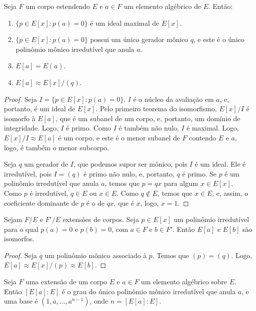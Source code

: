 \begin{prop}
    Seja $F$ um corpo estendendo $E$ e $a\in F$ um elemento algébrico de $E$. Então:
    \begin{enumerate}
        \item $\{p \in E[x]: p(a)=0\}$ é um ideal maximal de $E[x]$.
        \item $\{p \in E[x]: p(a)=0\}$ possui um único gerador mônico $q$, e este é o único polinômio mônico irredutível que anula $a$.
        \item $E[a]=E(a)$.
        \item $E[a]\approx E[x]/(q)$.
    \end{enumerate}
\end{prop}
\begin{proof}
    Seja $I=\{p \in E[x]: p(a)=0\}$. $I$ é o núcleo da avaliação em $a$, e, portanto, é um ideal de $E[x]$.
    Pelo primeiro teorema do isomorfismo, $E[x]/I$ é isomorfo à $E[a]$, que é um subanel de um corpo, e, portanto, um domínio de integridade. Logo, $I$ é primo.
    Como $I$ é também não nulo, $I$ é maximal.
    Logo, $E[x]/I\approx E[a]$ é um corpo, e este é o menor subanel de $F$ contendo $E$ e $a$, logo, é também o menor subcorpo.

    Seja $q$ um gerador de $I$, que podemos supor ser mônico, pois $I$ é um ideal.
    Ele é irredutível, pois $I=(q)$ é primo não nulo, e, portanto, $q$ é primo.
    Se $p$ é um polinômio irredutível que anula $a$, temos que $p=qx$ para algum $x \in E[x]$. Como $p$ é irredutível, $q \in E$ ou $x \in E$. Como $q \notin E$, temos que $x \in E$, e, assim, o coeficiente dominante de $p$ é o de $qx$, que é $x$, logo, $x=1$.
\end{proof}
\begin{corol}
    Sejam $F/E$ e $F'/E$ extensões de corpos. Seja $p\in E[x]$ um polinômio irredutível para o qual $p(a)=0$ e $p(b)=0$, com $a \in F$ e $b \in F'$.
    Então $E[a]$ e $E[b]$ são isomorfos.
\end{corol}
\begin{proof}
    Seja $q$ um polinômio mônico associado à $p$. Temos que $(p)=(q)$. Logo, $E[a]\approx E[x]/(p)\approx E[b]$.
\end{proof}
\begin{prop}
    Seja $F$ uma extensão de um corpo $E$ e $a \in F$ um elemento algébrico sobre $E$. Então $[E[a]:E]$ é o grau do único polinômio mônico irredutível que anula $a$, e uma base é $(1, a, \dots, a^{n-1})$, onde $n=[E[a]:E]$.
\end{prop}
